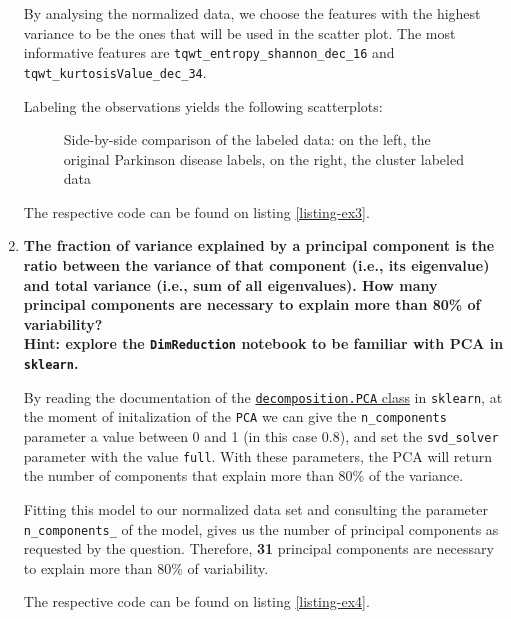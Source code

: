 \documentclass[12pt]{article}
\begin{document}
\begin{enumerate}[leftmargin=\labelsep]
          By analysing the normalized data, we choose the features with the highest
          variance to be the ones that will be used in the scatter plot.
          The most informative features are \texttt{tqwt\_entropy\_shannon\_dec\_16}
          and \texttt{tqwt\_kurtosisValue\_dec\_34}.

          Labeling the observations yields the following scatterplots:

          \begin{figure}[H]
              \centering
              
              \caption{Side-by-side comparison of the labeled data: on the left, the original Parkinson disease labels, on the right, the cluster labeled data}
              \label{fig:scatterplot-labels}
          \end{figure}

          The respective code can be found on listing \ref{listing-ex3}.

    \item {\color{questioncolor}\bfseries
          The fraction of variance explained by a principal component is the ratio
          between the variance of that component (i.e., its eigenvalue) and total
          variance (i.e., sum of all eigenvalues).
          How many principal components are necessary to explain more than 80\%
          of variability?\\
          Hint: explore the \texttt{DimReduction} notebook to be familiar
          with PCA in \texttt{sklearn}.
          }\\
          \vspace{0.5em}

          By reading the documentation of the
          \href{https://scikit-learn.org/stable/modules/generated/sklearn.decomposition.PCA.html}{\texttt{decomposition.PCA} class}
          in \texttt{sklearn}, at the moment of initalization of the \texttt{PCA} we can give
          the \texttt{n\_components} parameter a value between 0 and 1 (in this case 0.8),
          and set the \texttt{svd\_solver} parameter with the value \texttt{full}.
          With these parameters, the PCA will return the number of components that explain more than 80\% of the variance.


          Fitting this model to our normalized data set and consulting the parameter
          \texttt{n\_components\_} of the model, gives us the number of principal components
          as requested by the question.
          Therefore, \textbf{31} principal components are necessary to explain more than 80\% of variability.

          The respective code can be found on listing \ref{listing-ex4}.

\end{enumerate}
\end{document}

